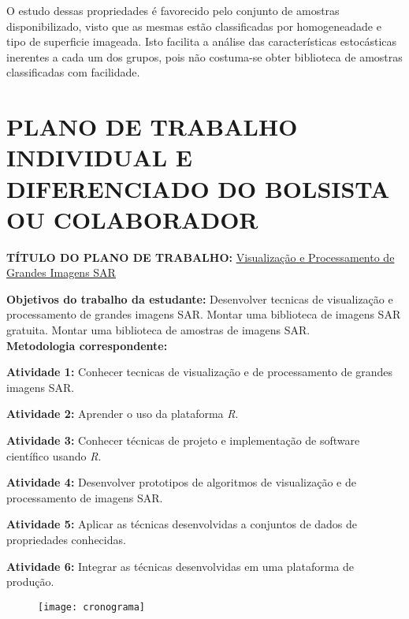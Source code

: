 \documentclass[12pt,letterpaper]{article}
\begin{document}
O estudo dessas propriedades é favorecido pelo conjunto de amostras disponibilizado, visto que as mesmas estão classificadas por homogeneadade e tipo de superficie imageada. Isto facilita a análise das características estocásticas inerentes a cada um dos grupos, pois não costuma-se obter biblioteca de amostras classificadas com facilidade.

  
\newpage

\begin{center}




\end{center}

  
  \newpage

\section*{\centering \textbf{PLANO DE TRABALHO INDIVIDUAL E DIFERENCIADO DO BOLSISTA OU COLABORADOR}} %

\textbf{TÍTULO DO PLANO DE TRABALHO:} \underline{Visualização e Processamento de Grandes Imagens SAR}

\textbf{Objetivos do trabalho da estudante:} Desenvolver tecnicas de visualização e processamento de grandes imagens SAR. Montar uma biblioteca de imagens SAR gratuita. Montar uma biblioteca de amostras de imagens SAR.\\

\textbf{Metodologia correspondente:}

\textbf{Atividade 1:} Conhecer tecnicas de visualização e de processamento de grandes imagens SAR.

\textbf{Atividade 2:} Aprender o uso da plataforma \textit{R}.

\textbf{Atividade 3:} Conhecer técnicas de projeto e implementação de software científico usando \textit{R}.

\textbf{Atividade 4:} Desenvolver prototipos de algoritmos de visualização e de processamento de imagens SAR.

\textbf{Atividade 5:} Aplicar as técnicas desenvolvidas a conjuntos de dados de propriedades conhecidas.

\textbf{Atividade 6:} Integrar as técnicas desenvolvidas em uma plataforma de produção.\\

\begin{figure}[H]
\begin{center}
\texttt{[image: cronograma]}
\end{center}
\end{figure}
\end{document}
